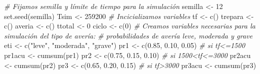 \documentclass[
]{book}
\newenvironment{Shaded}{\begin{snugshade}}{\end{snugshade}}
\newcommand{\CommentTok}[1]{\textcolor[rgb]{0.56,0.35,0.01}{\textit{#1}}}
\newcommand{\DecValTok}[1]{\textcolor[rgb]{0.00,0.00,0.81}{#1}}
\newcommand{\FloatTok}[1]{\textcolor[rgb]{0.00,0.00,0.81}{#1}}
\newcommand{\FunctionTok}[1]{\textcolor[rgb]{0.00,0.00,0.00}{#1}}
\newcommand{\NormalTok}[1]{#1}
\newcommand{\OtherTok}[1]{\textcolor[rgb]{0.56,0.35,0.01}{#1}}
\newcommand{\StringTok}[1]{\textcolor[rgb]{0.31,0.60,0.02}{#1}}
\theoremstyle{definition}
\theoremstyle{definition}
\theoremstyle{definition}
\theoremstyle{definition}
\theoremstyle{remark}
\begin{document}
\begin{Shaded}
\begin{Highlighting}[]
\CommentTok{\# Fijamos semilla y límite de tiempo para la simulación}
\NormalTok{semilla }\OtherTok{\textless{}{-}} \DecValTok{12}
\FunctionTok{set.seed}\NormalTok{(semilla)}
\NormalTok{Tsim }\OtherTok{\textless{}{-}} \DecValTok{259200}
\CommentTok{\# Incicializamos variables}
\NormalTok{tf }\OtherTok{\textless{}{-}} \FunctionTok{c}\NormalTok{()}
\NormalTok{trepara }\OtherTok{\textless{}{-}} \FunctionTok{c}\NormalTok{()}
\NormalTok{averia }\OtherTok{\textless{}{-}} \FunctionTok{c}\NormalTok{()}
\NormalTok{ttotal }\OtherTok{\textless{}{-}} \DecValTok{0}
\NormalTok{ciclo }\OtherTok{\textless{}{-}} \FunctionTok{c}\NormalTok{(}\DecValTok{0}\NormalTok{)}
\CommentTok{\# Creamos variables necesarias para la simulación del tipo de avería:}
\CommentTok{\# probabilidades de avería leve, moderada y grave}
\NormalTok{eti }\OtherTok{\textless{}{-}} \FunctionTok{c}\NormalTok{(}\StringTok{"leve"}\NormalTok{, }\StringTok{"moderada"}\NormalTok{, }\StringTok{"grave"}\NormalTok{)}
\NormalTok{pr1 }\OtherTok{\textless{}{-}} \FunctionTok{c}\NormalTok{(}\FloatTok{0.85}\NormalTok{, }\FloatTok{0.10}\NormalTok{, }\FloatTok{0.05}\NormalTok{)  }\CommentTok{\# si tf\textless{}=1500}
\NormalTok{pr1acu }\OtherTok{\textless{}{-}} \FunctionTok{cumsum}\NormalTok{(pr1)}
\NormalTok{pr2 }\OtherTok{\textless{}{-}} \FunctionTok{c}\NormalTok{(}\FloatTok{0.75}\NormalTok{, }\FloatTok{0.15}\NormalTok{, }\FloatTok{0.10}\NormalTok{)  }\CommentTok{\# si 1500\textless{}tf\textless{}=3000}
\NormalTok{pr2acu }\OtherTok{\textless{}{-}} \FunctionTok{cumsum}\NormalTok{(pr2)}
\NormalTok{pr3 }\OtherTok{\textless{}{-}} \FunctionTok{c}\NormalTok{(}\FloatTok{0.65}\NormalTok{, }\FloatTok{0.20}\NormalTok{, }\FloatTok{0.15}\NormalTok{)  }\CommentTok{\# si tf\textgreater{}3000}
\NormalTok{pr3acu }\OtherTok{\textless{}{-}} \FunctionTok{cumsum}\NormalTok{(pr3)}


\end{Highlighting}
\end{Shaded}
\end{document}
